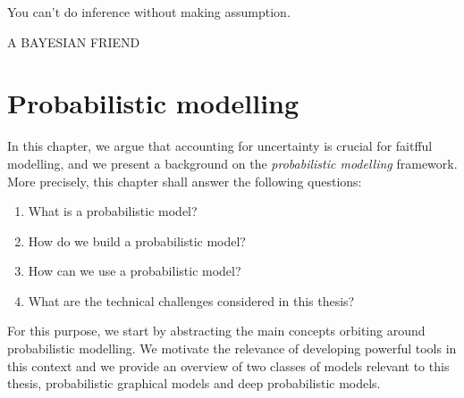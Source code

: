 {\centering
\parbox{\textwidth}{%
  \raggedright{\itshape%

  You can't do inference without making assumption.\par\bigskip
  }
  \raggedleft\MakeUppercase{A Bayesian friend}\par%
}}

\chapter{Probabilistic modelling}\label{ch:02}

\begin{chapter_outline}

  In this chapter, we argue that accounting for uncertainty is crucial for faitfful modelling, and we present a background on the \textit{probabilistic modelling} framework.
  More precisely, this chapter shall answer the following questions:
  \begin{enumerate}
    \item What is a probabilistic model?
    \item How do we build a probabilistic model?
    \item How can we use a probabilistic model?
    \item What are the technical challenges considered in this thesis?
  \end{enumerate}
    For this purpose, we start by abstracting the main concepts orbiting around probabilistic modelling. We motivate the relevance of developing powerful tools in this context and we provide an overview of two classes of models relevant to this thesis, probabilistic graphical models and deep probabilistic models.
\end{chapter_outline}



